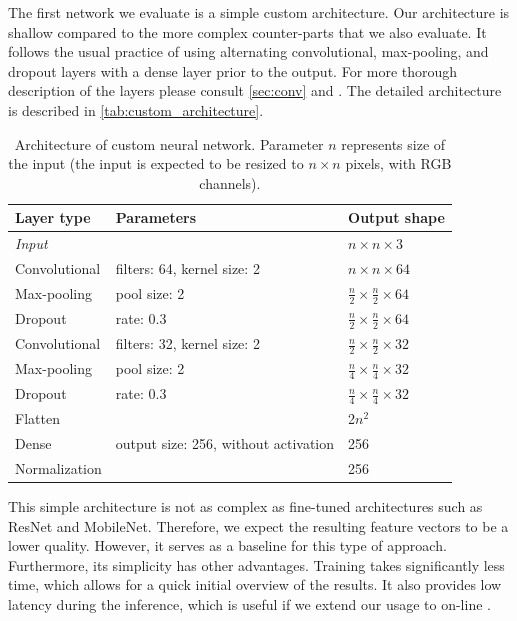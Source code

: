 The first network we evaluate is a simple custom architecture. Our architecture is shallow compared to the more complex counter-parts that we also evaluate. It follows the usual practice of using alternating convolutional, max-pooling, and dropout layers with a dense layer prior to the output. For more thorough description of the layers please consult \autoref{sec:conv} and \cite{deeplearningbook}. The detailed architecture is described in \autoref{tab:custom_architecture}.

\begin{table}
    \centering
    \begin{tabular}{l|l|l}
         Layer type & Parameters & Output shape \\ \hline
         \emph{Input} & & $n \times n \times 3$ \\
         Convolutional & filters: 64, kernel size: 2 & $n \times n \times 64$ \\
         Max-pooling & pool size: 2 & $\frac{n}{2} \times \frac{n}{2} \times 64$ \\
         Dropout & rate: 0.3 & $\frac{n}{2} \times \frac{n}{2} \times 64$ \\
         Convolutional & filters: 32, kernel size: 2 & $\frac{n}{2} \times \frac{n}{2} \times 32$ \\
         Max-pooling & pool size: 2 & $\frac{n}{4} \times \frac{n}{4} \times 32$ \\
         Dropout & rate: 0.3 & $\frac{n}{4} \times \frac{n}{4} \times 32$ \\
         Flatten & & 2$n^2$ \\
         Dense & output size: 256, without activation & 256 \\
         Normalization & & 256
    \end{tabular}
    \caption[Architecture of custom neural network]{Architecture of custom neural network. Parameter $n$ represents size of the input (the input is expected to be resized to $n\times n$ pixels, with RGB channels).}
    \label{tab:custom_architecture}
\end{table}

This simple architecture is not as complex as fine-tuned architectures such as ResNet and MobileNet. Therefore, we expect the resulting feature vectors to be a lower quality. However, it serves as a baseline for this type of approach. Furthermore, its simplicity has other advantages. Training takes significantly less time, which allows for a quick initial overview of the results. It also provides low latency during the inference, which is useful if we extend our usage to on-line \reid{}.

